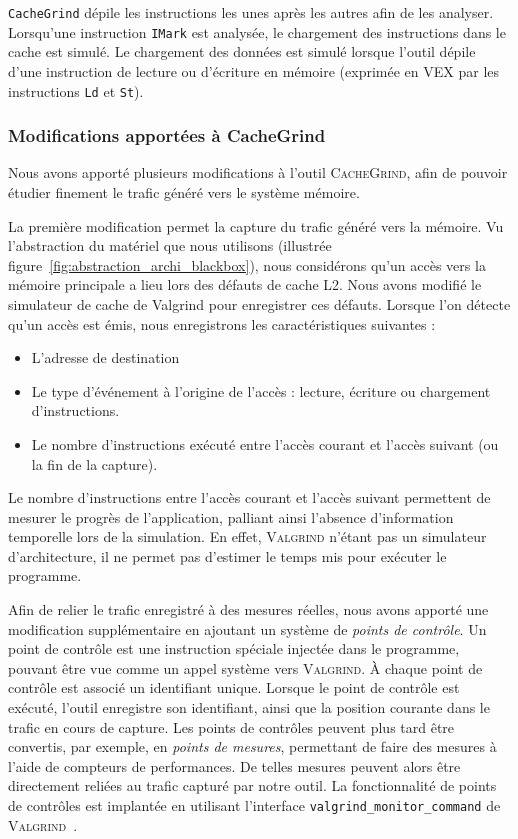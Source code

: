 \texttt{CacheGrind} dépile les instructions les unes après les autres afin de les analyser.
Lorsqu'une instruction \texttt{IMark} est analysée, le chargement des instructions dans le cache est simulé.
Le chargement des données est simulé lorsque l'outil dépile d'une instruction de lecture ou d'écriture en mémoire (exprimée en \textsc{VEX} par les instructions \texttt{Ld} et \texttt{St}).



\subsubsection{Modifications apportées à CacheGrind}

Nous avons apporté plusieurs modifications à l'outil \textsc{CacheGrind}, afin de pouvoir étudier finement le trafic généré vers le système mémoire.

La première modification permet la capture du trafic généré vers la mémoire.
Vu l'abstraction du matériel que nous utilisons (illustrée figure~\ref{fig:abstraction_archi_blackbox}), nous considérons qu'un accès vers la mémoire principale a lieu lors des défauts de cache L2.
Nous avons modifié le simulateur de cache de Valgrind pour enregistrer ces défauts.
Lorsque l'on détecte qu'un accès est émis, nous enregistrons les caractéristiques suivantes :

\begin{itemize}
	\item L'adresse de destination
	\item Le type d'événement à l'origine de l'accès : lecture, écriture ou chargement d'instructions.
	\item Le nombre d'instructions exécuté entre l'accès courant et l'accès suivant (ou la fin de la capture).
\end{itemize}

Le nombre d'instructions entre l'accès courant et l'accès suivant permettent de mesurer le progrès de l'application, palliant ainsi l'absence d'information temporelle lors de la simulation.
En effet, \textsc{Valgrind} n'étant pas un simulateur d'architecture, il ne permet pas d'estimer le temps mis pour exécuter le programme.

Afin de relier le trafic enregistré à des mesures réelles, nous avons apporté une modification supplémentaire en ajoutant un système de \emph{points de contrôle}.
Un point de contrôle est une instruction spéciale injectée dans le programme, pouvant être vue comme un appel système vers \textsc{Valgrind}.
À chaque point de contrôle est associé un identifiant unique.
Lorsque le point de contrôle est exécuté, l'outil enregistre son identifiant, ainsi que la position courante dans le trafic en cours de capture.
Les points de contrôles peuvent plus tard être convertis, par exemple, en \emph{points de mesures}, permettant de faire des mesures à l'aide de compteurs de performances.
De telles mesures peuvent alors être directement reliées au trafic capturé par notre outil.
La fonctionnalité de points de contrôles est implantée en utilisant l'interface \texttt{valgrind\_monitor\_command} de \textsc{Valgrind}~\cite{valgrindmonitor}.

